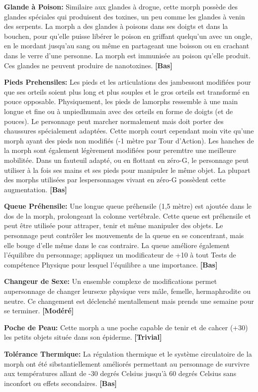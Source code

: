 {{\textbf{Glande à Poison:} Similaire aux glandes à drogue, cette morph possède des glandes spéciales qui produisent des toxines, un peu comme les glandes à venin des serpents. La morph a des glandes à poisons dans ses doigts et dans la bouchen, pour qu'elle puisse libérer le poison en griffant quelqu'un avec un ongle, en le mordant jusqu'au sang ou même en partageant une boisson ou en crachant dans le verre d'une personne. La morph est immunisée au poison qu'elle produit. Ces glandes ne peuvent produire de nanotoxines. \textbf{[Bas]} 

\textbf{Pieds Prehensiles:} Les pieds et les articulations des jambessont modifiées pour que ses orteils soient plus long et plus souples et le gros orteils est transformé en pouce opposable. Physiquement, les pieds de lamorphs ressemble à une main longue et fine ou à unpiedhumain avec des orteils en forme de doigts (et de pouces). Le personnage peut marcher normalement mais doit porter des chaussures spécialement adaptées. Cette morph court cependant moin vite qu'une morph ayant des pieds non modifiés (-1 mètre par Tour d'Action). Les hanches de la morph sont également légèrement modifiées pour peremttre une meilleure mobilitée. Dans un fauteuil adapté, ou en flottant en zéro-G, le personnage peut utiliser à la fois ses mains et ses pieds pour manipuler le même objet. La plupart des morphs utilisées par lespersonnages vivant en zéro-G possèdent cette augmentation. \textbf{[Bas]} 

\textbf{Queue Préhensile:} Une longue queue préhensile (1,5 mètre) est ajoutée dans le dos de la morph, prolongeant la colonne vertébrale. Cette queue est préhensile et peut être utilisée pour attraper, tenir et même manipuler des objets. Le personnage peut contrôler les mouvements de la queue en se concentrant, mais elle bouge d'elle même dans le cas contraire. La queue améliore également l'équilibre du personnage; appliquez un modificateur de +10 à tout Tests de compétence Physique pour lesquel l'équilibre a une importance. \textbf{[Bas]} 

\textbf{Changeur de Sexe:} Un ensemble complexe de modifications permet aupersonnage de changer leursexe physique vers mâle, femelle, hermaphrodite ou neutre. Ce changement est déclenché mentallement mais prends une semaine pour se terminer. \textbf{[Modéré]} 

\textbf{Poche de Peau:} Cette morph a une poche capable de tenir et de cahcer (+30) les petits objets située dans son épiderme. \textbf{[Trivial]} 

\textbf{Tolérance Thermique:} La régulation thermique et le système circulatoire de la morph ont été sibstantiellement améliorés permettant au personnage de survivre aux températures allant de -30 degrés Celsius jusqu'à 60 degrés Celsius sans inconfort ou effets secondaires. \textbf{[Bas]} 

}}
